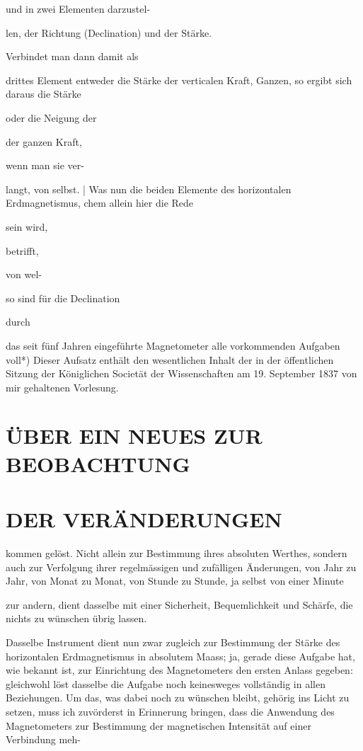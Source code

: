 \documentclass[12pt,a4paper]{article}
\begin{document}
und in zwei Elementen darzustel-

len, der Richtung (Declination) und der Stärke.

Verbindet man dann damit als

drittes Element entweder die Stärke der verticalen Kraft, Ganzen, so ergibt sich daraus die Stärke

oder die Neigung der

der ganzen Kraft,

wenn man sie ver-

langt, von selbst. | Was nun die beiden Elemente des horizontalen Erdmagnetismus, chem allein hier die Rede

sein wird,

betrifft,

von wel-

so sind für die Declination

durch

das seit fünf Jahren eingeführte Magnetometer alle vorkommenden Aufgaben voll*) Dieser Aufsatz enthält den wesentlichen Inhalt der in der öffentlichen Sitzung der Königlichen Societät der Wissenschaften am 19. September 1837 von mir gehaltenen Vorlesung.

\section*{ÜBER EIN NEUES ZUR BEOBACHTUNG}
\section*{DER VERÄNDERUNGEN}
kommen gelöst. Nicht allein zur Bestimmung ihres absoluten Werthes, sondern auch zur Verfolgung ihrer regelmässigen und zufälligen Änderungen, von Jahr zu Jahr, von Monat zu Monat, von Stunde zu Stunde, ja selbst von einer Minute

zur andern, dient dasselbe mit einer Sicherheit, Bequemlichkeit und Schärfe, die nichts zu wünschen übrig lassen.

Dasselbe Instrument dient nun zwar zugleich zur Bestimmung der Stärke des horizontalen Erdmagnetismus in absolutem Maass; ja, gerade diese Aufgabe hat, wie bekannt ist, zur Einrichtung des Magnetometers den ersten Anlass gegeben: gleichwohl löst dasselbe die Aufgabe noch keinesweges vollständig in allen Beziehungen. Um das, was dabei noch zu wünschen bleibt, gehörig ins Licht zu setzen, muss ich zuvörderst in Erinnerung bringen, dass die Anwendung des Magnetometers zur Bestimmung der magnetischen Intensität auf einer Verbindung meh-
\end{document}
